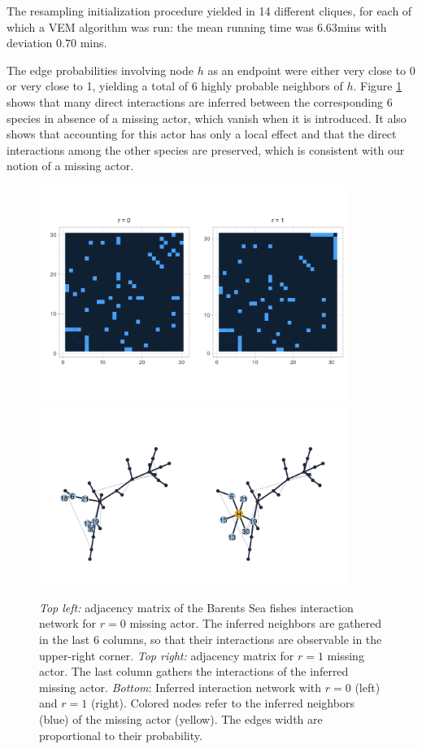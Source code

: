 The resampling initialization procedure yielded in 14 different cliques, for each of which a VEM algorithm was run: the mean running time was $6.63$mins with deviation $0.70$ mins. 

The edge probabilities involving node $h$ as an endpoint were either very close to 0 or very close to 1, yielding a total of 6 highly probable neighbors of $h$. Figure \ref{fig:barents_adj} shows that many direct interactions are inferred between the corresponding 6 species in absence of a missing actor, which vanish when it is introduced. It also shows that accounting for this actor has only a local effect and that the direct interactions among the other species are preserved, which is consistent with our notion of a missing actor.

\begin{figure}[H]
    \centering
    \includegraphics[width=10cm]{figs/Barents_mat_comp.png} \\\vspace{-2cm}
    \includegraphics[width=10cm]{figs/Barents_net_comp3.png}
    \caption{\textit{Top left:} adjacency matrix of the Barents Sea fishes interaction network for $r=0$  missing actor. The inferred neighbors are gathered in the last 6 columns, so that their interactions are observable in the upper-right corner. \textit{Top right:} adjacency matrix for $r=1$  missing actor. The last column gathers the interactions of the inferred missing actor. \textit{Bottom}: Inferred interaction network with $r=0$ (left) and $r=1$ (right). Colored nodes refer to the inferred neighbors (blue) of the missing actor (yellow). The edges width are proportional to their probability.}
    \label{fig:barents_adj}
\end{figure}

